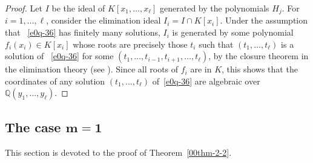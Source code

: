 \documentclass[10pt,a4paper]{amsart}
\numberwithin{equation}{section}
\def\Q{\mathbb Q}
\begin{document}
\begin{proof} Let $I$ be the ideal of $K[x_1,\dots,x_\ell]$ generated
 by the polynomials $H_j$. For $i=1,\dots,\ell$, consider the
 elimination ideal $I_i=I\cap K[x_i]$. Under the assumption that
~\eqref{e0q-36} has finitely many solutions, $I_i$ is generated by
 some polynomial $f_i(x_i)\in K[x_i]$ whose roots are precisely those
 $t_i$ such that $(t_1,\dots,t_\ell)$ is a solution of
~\eqref{e0q-36} for some $(t_1,\dots,t_{i-1},t_{i+1},\dots,t_\ell)$,
 by the closure theorem in the elimination theory (see \cite[Theorem
 3, Section 3.3]{Cox}). Since all roots of $f_i$ are in $K$, this
 shows that the coordinates of any solution
 $(t_1,\dots,t_\ell)$ of~\eqref{e0q-36} are algebraic over
 $\Q(y_1,\dots,y_\ell)$.
\end{proof}

\subsection[The case m=1]{The case $\boldsymbol{m=1}$}
This section is devoted to the proof of Theorem~\ref{00thm-2-2}.
\end{document}
